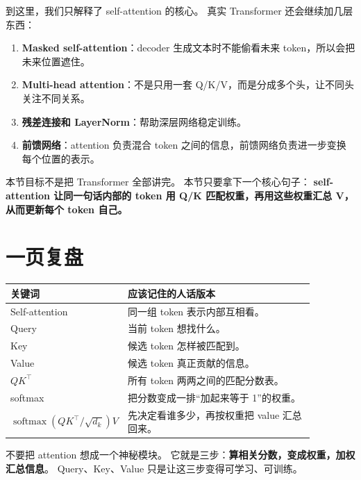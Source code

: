 \documentclass[11pt,a4paper]{ctexart}
\newcommand{\softmax}{\operatorname{softmax}}
\begin{document}
到这里，我们只解释了 self-attention 的核心。
真实 Transformer 还会继续加几层东西：

\begin{enumerate}
  \item \textbf{Masked self-attention}：decoder 生成文本时不能偷看未来 token，所以会把未来位置遮住。
  \item \textbf{Multi-head attention}：不是只用一套 Q/K/V，而是分成多个头，让不同头关注不同关系。
  \item \textbf{残差连接和 LayerNorm}：帮助深层网络稳定训练。
  \item \textbf{前馈网络}：attention 负责混合 token 之间的信息，前馈网络负责进一步变换每个位置的表示。
\end{enumerate}

\begin{keypointblock}
本节目标不是把 Transformer 全部讲完。
本节只要拿下一个核心句子：
\textbf{self-attention 让同一句话内部的 token 用 Q/K 匹配权重，再用这些权重汇总 V，从而更新每个 token 自己。}
\end{keypointblock}

\section{一页复盘}

\begin{center}
\begin{tabular}{>{\raggedright\arraybackslash}p{0.23\linewidth} >{\raggedright\arraybackslash}p{0.64\linewidth}}
\toprule
关键词 & 应该记住的人话版本 \\
\midrule
Self-attention & 同一组 token 表示内部互相看。\\
Query & 当前 token 想找什么。\\
Key & 候选 token 怎样被匹配到。\\
Value & 候选 token 真正贡献的信息。\\
\(QK^\top\) & 所有 token 两两之间的匹配分数表。\\
softmax & 把分数变成一排“加起来等于 1”的权重。\\
\(\softmax(QK^\top/\sqrt{d_k})V\) & 先决定看谁多少，再按权重把 value 汇总回来。\\
\bottomrule
\end{tabular}
\end{center}

\begin{keypointblock}
不要把 attention 想成一个神秘模块。
它就是三步：\textbf{算相关分数，变成权重，加权汇总信息}。
Query、Key、Value 只是让这三步变得可学习、可训练。
\end{keypointblock}
\end{document}
